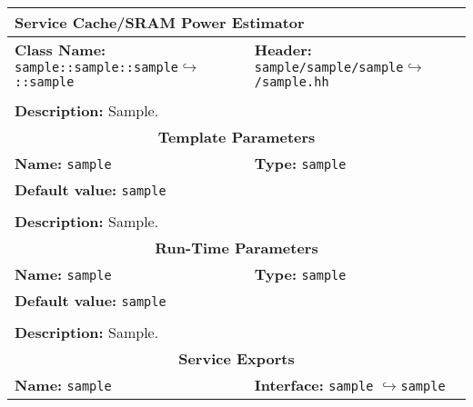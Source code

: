 \newpage
\begin{center}
	\begin{tabular}{|p{7.5cm}|p{7.5cm}|}
		\hline
		\multicolumn{2}{|l|}{\textbf{\Large Service Cache/SRAM Power Estimator}}\\
		\hline
		\multicolumn{1}{|p{7.5cm}}{\textbf{Class Name:} \newline \texttt{sample::sample::sample}\newline$\hookrightarrow$\texttt{::sample}} & \multicolumn{1}{p{7.5cm}|}{\textbf{Header:} \newline \texttt{sample/sample/sample}\newline$\hookrightarrow$\texttt{/sample.hh}}\\
		\multicolumn{2}{|l|}{}\\
		\multicolumn{2}{|p{15cm}|}{\textbf{Description:} \newline Sample.}\\
		\hline
		\hline
		\multicolumn{2}{|c|}{\textbf{\large Template Parameters}}\\
		\hline
		\multicolumn{1}{|p{7.5cm}}{\textbf{Name:} \texttt{sample}} & \multicolumn{1}{p{7.5cm}|}{\textbf{Type:} \texttt{sample}}\\
		\multicolumn{2}{|p{15cm}|}{\textbf{Default value:} \texttt{sample}}\\
		\multicolumn{2}{|l|}{}\\
		\multicolumn{2}{|p{15cm}|}{\textbf{Description:} \newline Sample.}\\
		\hline
		\hline
		\multicolumn{2}{|c|}{\textbf{\large Run-Time Parameters}}\\
		\hline
		\multicolumn{1}{|p{7.5cm}}{\textbf{Name:} \texttt{sample}} & \multicolumn{1}{p{7.5cm}|}{\textbf{Type:} \texttt{sample}}\\
		\multicolumn{2}{|p{15cm}|}{\textbf{Default value:} \texttt{sample}}\\
		\multicolumn{2}{|l|}{}\\
		\multicolumn{2}{|p{15cm}|}{\textbf{Description:} \newline Sample.}\\
		\hline
		\hline
		\multicolumn{2}{|c|}{\textbf{\large Service Exports}}\\
		\hline
		\multicolumn{1}{|p{7.5cm}}{\textbf{Name:} \texttt{sample}} & \multicolumn{1}{p{7.5cm}|}{\textbf{Interface:} \newline \texttt{sample} \newline$\hookrightarrow$\texttt{sample}}\\

\end{tabular}
\end{center}
